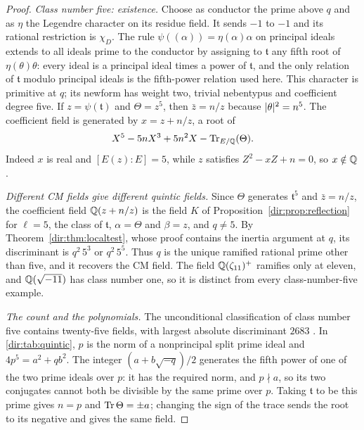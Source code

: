 \begin{proof}
\emph{Class number five: existence.} Choose as conductor the prime above $q$ and as
$\eta$ the Legendre character on its residue field. It sends $-1$ to $-1$ and its
rational restriction is $\chi_D$. The rule $\psi((\alpha))=\eta(\alpha)\alpha$ on
principal ideals extends to all ideals prime to the conductor by assigning to
$\mathfrak t$ any fifth root of $\eta(\theta)\theta$: every ideal is a principal ideal
times a power of $\mathfrak t$, and the only relation of $\mathfrak t$ modulo principal
ideals is the fifth-power relation used here. This character is primitive at $q$; its
newform has weight two, trivial nebentypus and coefficient degree five. If
$z=\psi(\mathfrak t)$ and $\Theta=z^5$, then $\bar z=n/z$ because $\lvert\theta\rvert^2=n^5$.
The coefficient field is generated by $x=z+n/z$, a root of
\[
 X^5-5nX^3+5n^2X-\operatorname{Tr}_{E/\mathbb{Q}}(\Theta).
\]
Indeed $x$ is real and $[E(z):E]=5$, while $z$ satisfies $Z^2-xZ+n=0$, so
$x\notin\mathbb{Q}$.

\emph{Different CM fields give different quintic fields.} Since $\Theta$ generates
$\mathfrak t^5$ and $\bar z=n/z$, the coefficient field $\mathbb{Q}(z+n/z)$ is the field $K$ of
Proposition~\ref{dir:prop:reflection} for $\ell=5$, the class of $\mathfrak t$, $\alpha=\Theta$
and $\beta=z$, and $q\ne5$. By Theorem~\ref{dir:thm:localtest}, whose proof contains the
inertia argument at $q$, its discriminant is $q^2\,5^3$ or $q^2\,5^5$. Thus $q$ is
the unique ramified rational prime other than five, and it recovers the CM field. The field $\mathbb{Q}(\zeta_{11})^+$ ramifies only at eleven, and
$\mathbb{Q}(\sqrt{-11})$ has class number one, so it is distinct from every class-number-five
example.

\emph{The count and the polynomials.} The unconditional classification of class number
five contains twenty-five fields, with largest absolute discriminant $2683$
\cite{Watkins2004Class}. In \cref{dir:tab:quintic}, $p$ is the norm of a nonprincipal
split prime ideal and $4p^5=a^2+qb^2$. The integer $(a+b\sqrt{-q})/2$ generates the
fifth power of one of the two prime ideals over $p$: it has the required norm, and
$p\nmid a$, so its two conjugates cannot both be divisible by the same prime over $p$.
Taking $\mathfrak t$ to be this prime gives $n=p$ and $\operatorname{Tr}\Theta=\pm a$; changing the
sign of the trace sends the root to its negative and gives the same field.
\end{proof}

